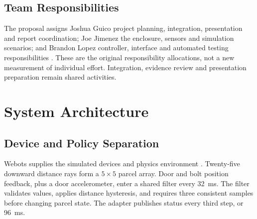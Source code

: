 \documentclass[conference,letterpaper]{IEEEtran}
\begin{document}
\subsection{Team Responsibilities}
The proposal assigns Joshua Guico project planning, integration, presentation and report coordination; Joe Jimenez the enclosure, sensors and simulation scenarios; and Brandon Lopez controller, interface and automated testing responsibilities \cite{proposal}. These are the original responsibility allocations, not a new measurement of individual effort. Integration, evidence review and presentation preparation remain shared activities.

\section{System Architecture}
\subsection{Device and Policy Separation}
Webots supplies the simulated devices and physics environment \cite{webots}. Twenty-five downward distance rays form a $5\times5$ parcel array. Door and bolt position feedback, plus a door accelerometer, enter a shared filter every 32~ms. The filter validates values, applies distance hysteresis, and requires three consistent samples before changing parcel state. The adapter publishes status every third step, or 96~ms.
\end{document}
